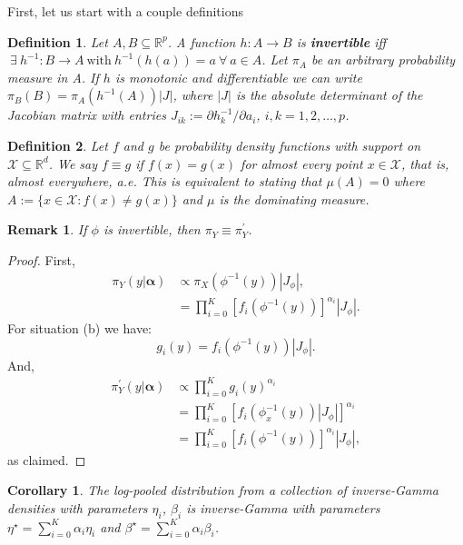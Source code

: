 \documentclass[a4paper, notitlepage, 10pt]{article}
\newtheorem{remark}{Remark}[]
\newtheorem{corollary}{Corollary}[]
\newtheorem{definition}{Definition}[]
\begin{document}
First, let us start with a couple definitions
\begin{definition}
Let $A, B \subseteq \mathbb{R}^p$.
A function  $h: A \to B$ is \textbf{invertible} iff $\: \exists \: h^{-1}: B \to A \: \text{with} \: h^{-1}(h(a)) = a \: \forall \: a \in A$. 
Let $\pi_A$ be an arbitrary probability measure in A. 
If $h$ is monotonic and differentiable we can write $\pi_B(B) = \pi_A(h^{-1}(A))|J|$, where $|J|$ is the absolute determinant of the Jacobian matrix with entries $J_{ik} := \partial h_k^{-1}/\partial a_i$, $i,k = 1, 2, \ldots, p$.
\end{definition}

\begin{definition}
 Let $f$ and $g$ be probability density functions with support on $\mathcal{X} \subseteq \mathbb{R}^d$.
 We say $f \equiv g$ if $f(x) = g(x)$ for almost every point $x \in \mathcal{X}$, that is, \textit{almost everywhere, a.e.}
 This is equivalent to stating that $\mu(A) = 0$ where $A := \{ x \in \mathcal{X} : f(x) \neq g(x) \}$ and $\mu$ is the dominating measure.
\end{definition}
\begin{remark}
\label{rmk:invariance}
If $\phi$ is invertible, then $\pi_Y \equiv \pi_Y^{\prime}$.
\end{remark}
\begin{proof}
First, 
\begin{align}
 \pi_Y(y | \boldsymbol \alpha) & \propto \pi_{X}(\phi^{-1}(y))|J_\phi|, \\
&= \prod_{i = 0}^K \left[ f_i(\phi^{-1}(y)) \right]^{\alpha_i}|J_\phi|.
\end{align}
For situation (b) we have:
\begin{equation}
 g_i(y) = f_i(\phi^{-1}(y))|J_\phi|.
\end{equation}
And,
\begin{align}
 \pi_Y^{\prime}(y |  \boldsymbol \alpha) & \propto  \prod_{i=0}^K g_i(y)^{\alpha_i} \\
  & =  \prod_{i=0}^K \left[ f_i(\phi_x^{-1}(y))|J_\phi| \right]^{\alpha_i} \\
  & = \prod_{i = 0}^K \left[ f_i(\phi^{-1}(y)) \right]^{\alpha_i}|J_\phi|,
\end{align}
as claimed.
\end{proof}
\begin{corollary}
\label{clr:inverseGamma}
 The log-pooled distribution from a collection of inverse-Gamma densities with parameters $\eta_i$, $\beta_i$ is inverse-Gamma with parameters $\eta^\star = \sum_{i = 0}^K \alpha_i \eta_i$ and $\beta^\star = \sum_{i = 0}^K \alpha_i \beta_i$.
\end{corollary}
\end{document}
